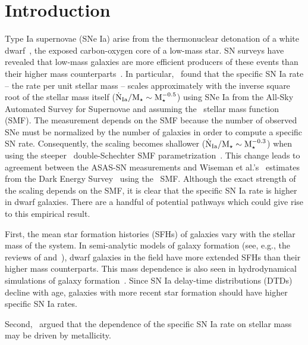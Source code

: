 \documentclass[foo.tex]{subfiles}
\begin{document}
\section{Introduction}
\label{sec:intro}

Type Ia supernovae (SNe Ia) arise from the thermonuclear detonation of a white
dwarf~\citep[WD;][]{Hoyle1960, Colgate1969}, the exposed carbon-oxygen core of
a low-mass star.
SN surveys have revealed that low-mass galaxies are more efficient producers
of these events than their higher mass counterparts~\citep[e.g.,][]{Mannucci2005,
Sullivan2006, Li2011, Smith2012}.
In particular,~\citet{Brown2019} found that the specific SN Ia rate -- the rate
per unit stellar mass -- scales approximately with the inverse square root of
the stellar mass itself ($\dot{\text{N}}_\text{Ia} / \text{M}_\star \sim \text{M}_\star^{-0.5}$)
using SNe Ia from the All-Sky Automated Survey for Supernovae
\citep[ASAS-SN;][]{Shappee2014, Kochanek2017} and assuming the~\citet{Bell2003}
stellar mass function (SMF).
The measurement depends on the SMF because the number of
observed SNe must be normalized by the number of galaxies in order to compute a
specific SN rate.
Consequently, the scaling becomes shallower ($\dot{\text{N}}_\text{Ia} / \text{M}_\star
\sim \text{M}_\star^{-0.3}$) when using the steeper~\citet{Baldry2012} double-Schechter
SMF parametrization~\citep{Gandhi2022}.
This change leads to agreement between the ASAS-SN measurements and Wiseman et
al.'s~\citeyearpar{Wiseman2021} estimates from the Dark Energy
Survey~\citep[DES;][]{DES2016} using the~\citet{Baldry2012} SMF.
Although the exact strength of the scaling depends on the SMF, it is clear
that the specific SN Ia rate is higher in dwarf galaxies.
There are a handful of potential pathways which could give rise to this
empirical result.
\par
First, the mean star formation histories (SFHs) of galaxies vary with the
stellar mass of the system.
In semi-analytic models of galaxy formation (see, e.g., the reviews of
\citealt{Baugh2006} and~\citealt{Somerville2015a}), dwarf galaxies in the field
have more extended SFHs than their higher mass counterparts.
This mass dependence is also seen in hydrodynamical simulations of galaxy
formation~\citep[e.g.,][]{GarrisonKimmel2019}.
Since SN Ia delay-time distributions (DTDs) decline with age, galaxies with
more recent star formation should have higher specific SN Ia rates.
\par
Second,~\citet{Kistler2013} argued that the dependence of the specific SN Ia
rate on stellar mass may be driven by metallicity.
\end{document}
